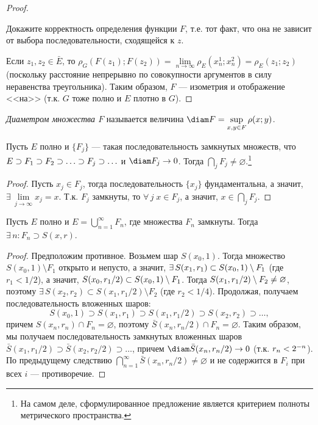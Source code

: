 \documentclass[10pt]{article}
\newcommand*{\p}[1]{#1\nobreak\discretionary{}{\hbox{$\mathsurround=0pt #1$}}{}}
\begin{document}
\begin{proof}
\begin{problem}
Докажите корректность определения функции $F$, т.е. тот факт, что
она не зависит от выбора последовательности, сходящейся к $z$.
\end{problem}

Если $z_1,z_2\in\bar{E}$, то
$\rho_G(F(z_1);F(z_2))=\lim\limits_{n\to\infty}\rho_E(x_n^1;x_n^2)=\rho_E(z_1;z_2)$
(поскольку расстояние непрерывно по совокупности аргументов в силу
неравенства треугольника). Таким образом, $F$ --- изометрия и
отображение <<на>> (т.к. $G$ тоже полно и $E$ плотно в $G$).
\end{proof}

\begin{df}
\emph{Диаметром множества $F$} называется величина $\diam
F=\sup\limits_{x,y\in F}\rho(x;y)$.
\end{df}

\begin{theorem}
Пусть $E$ полно и $\{F_j\}$ --- такая последовательность замкнутых
множеств, что $E\supset F_1\p\supset F_2\supset\ldots\supset
F_j\supset\ldots$ и $\diam F_j\to 0$. Тогда $\bigcap\limits_j
F_j\neq\varnothing$.\footnote{На самом деле, сформулированное
предложение является критерием полноты метрического пространства.}
\end{theorem}

\begin{proof}
Пусть $x_j\in F_j$, тогда последовательность $\{x_j\}$
фундаментальна, а значит, $\exists\,\lim\limits_{j\to\infty}x_j=x$.
Т.к. $F_j$ замкнуты, то $\forall\, j\;x\in F_j$, а значит,
$x\in\bigcap\limits_j F_j$.
\end{proof}

\begin{theorem}[Бэр]\label{th.Ber}
Пусть $E$ полно и $E=\bigcup\limits_{n=1}^\infty F_n$, где множества
$F_n$ замкнуты. Тогда $\exists\,n:F_n\supset S(x,r)$.
\end{theorem}

\begin{proof}
Предположим противное. Возьмем шар $S(x_0,1)$. Тогда множество
$S(x_0,1)\setminus F_1$ открыто и непусто, а значит, $\exists\,
S(x_1,r_1)\subset S(x_0,1)\p\setminus F_1$ (где $r_1<1/2$), а
значит, $S(x_0,r_1/2)\subset S(x_0,1)\p\setminus F_1$. Тогда
$S(x_1,r_1/2)\p\setminus F_2\neq\varnothing$, поэтому
$\exists\,S(x_2,r_2)\subset S(x_1,r_1/2)\setminus F_2$ (где
$r_2<1/4$). Продолжая, получаем последовательность вложенных шаров:
$$S(x_0,1)\supset S(x_1,r_1)\supset S(x_1,r_1/2)\supset
S(x_2,r_2)\supset\ldots,$$ причем $S(x_n,r_n)\cap F_n=\varnothing$,
поэтому $\bar{S}(x_n,r_n/2)\cap F_n=\varnothing$. Таким образом, мы
получаем последовательность замкнутых вложенных шаров
$\bar{S}(x_1,r_1/2)\supset \bar{S}(x_2,r_2/2)\supset \ldots$, причем
$\diam \bar{S}(x_n,r_n/2)\to0$ (т.к. $r_n\p<2^{-n}$). По предыдущему
следствию $\bigcap\limits_{n=1}^\infty
\bar{S}(x_n,r_n/2)\neq\varnothing$ и не содержится в $F_i$ при всех
$i$ --- противоречие.
\end{proof}
\end{document}
